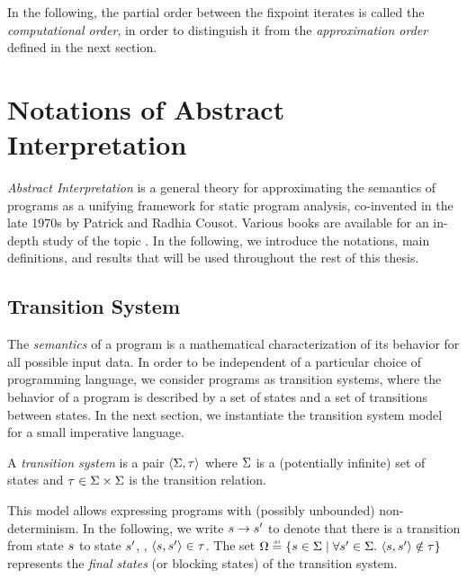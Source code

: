 In the following, the partial order between the fixpoint iterates is called the \emph{computational order}, in order to distinguish it from the \emph{approximation order} defined in the next section.


\section{Notations of Abstract Interpretation}

\emph{Abstract Interpretation}  is a general theory for approximating the semantics of programs as a unifying framework for static program analysis, co-invented in the late 1970s by Patrick and Radhia Cousot.
Various books are available for an in-depth study of the topic .
In the following, we introduce the notations, main definitions, and results that will be used throughout the rest of this thesis.

\subsection{Transition System}

The \emph{semantics} of a program is a mathematical characterization of its behavior for all possible input data.
In order to be independent of a particular choice of programming language, we consider programs as transition systems, where the behavior of a program is described by a set of states and a set of transitions between states.
In the next section, we instantiate the transition system model for a small imperative language.

\begin{definition}
  A \emph{transition system} is a pair $\langle \Sigma, \tau \rangle$ where $\Sigma$ is a (potentially infinite) set of states and $\tau \in \Sigma\times\Sigma$ is the transition relation.
\end{definition}

This model allows expressing programs with (possibly unbounded) non-determinism.
In the following, we write $s \rightarrow s'$ to denote that there is a transition from state $s$ to state $s'$, \ie, $\langle s, s' \rangle \in \tau$.
The set $\finalstates \defeq \setdef{\defstate \in \state}{\forall \defstate' \in \state.\spacer \tuple{\defstate}{\defstate'} \notin \transitionrelation}$ represents the \emph{final states} (or blocking states) of the transition system.


